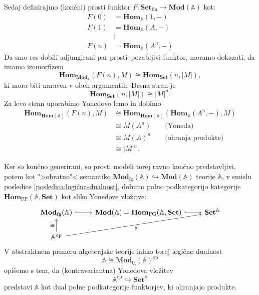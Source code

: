 \documentclass[../kategoricna_logika.tex]{subfiles}
\begin{document}
Sedaj definirajmo (končni) prosti funktor \(F : \mathbf{Set}_{ \mathrm{fin}} \to \mathbf{Mod}(\mathbb{A})\) 
kot:
\begin{align*}
F(0) &= \mathbf{Hom}_{\mathbb{A}}(1,-) \\
F(1) &= \mathbf{Hom}_{\mathbb{A}}(A,-) \\
&\vdots \\
F(n) &= \mathbf{Hom}_{\mathbb{A}}(A^n, -)
\end{align*}
Da smo res dobili adjungirani par prosti--pozabljivi funktor, moramo dokazati, da
imamo izomorfizem
\[ \mathbf{Hom}_{\mathbf{Mod}_{\mathbb{A}}}(F(n), M) \cong \mathbf{Hom}_{\mathbf{Set}}(n, |M|), \]
ki mora biti naraven v obeh argumentih. Desna stran je 
\[\mathbf{Hom}_{\mathbf{Set}}(n, |M|) \cong |M|^n. \]
Za levo stran uporabimo Yonedovo lemo in dobimo
\begin{align*}
\mathbf{Hom}_{\mathbf{Hom}(\mathbb{A})}(F(n),M) &\cong  \mathbf{Hom}_{\mathbf{Hom}(\mathbb{A})}(\mathbf{Hom}_{\mathbb{A}}(A^n, -), M) \\
&\cong M(A^n) \qquad \text{(Yoneda)} \\
&\cong M(A)^n \qquad \text{(ohranja produkte)} \\
&\cong |M|^n.
\end{align*}

Ker so končno generirani, so prosti modeli torej ravno končno predstavljivi, potem
kot ">obratno"< semantiko
\(\mathbf{Mod}_{\mathrm{fg}}(\mathbb{A}) \hookrightarrow \mathbf{Mod}(\mathbb{A})\)
teorije \(\mathbb{A}\), v smislu posledice \ref{posledica:logična-dualnost},
dobimo polno podkategorijo kategorije
\(\mathbf{Hom}_{\mathrm{FP}}(\mathbb{A}, \mathbf{Set})\) kot sliko Yonedove vložitve:
\begin{equation*}
\begin{tikzcd}
\mathbf{Mod}_{\mathrm{fg}}(\mathbb{A}) \ar[r, hook] & \mathbf{Mod}(\mathbb{A}) = \mathbf{Hom}_{\mathrm{FG}}(\mathbb{A}, \mathbf{Set}) \ar[r, hook] & \mathbf{Set}^{\mathbb{A}} \\
\mathbb{A}^{\mathrm{op}} \ar[u, "\cong"] \ar[urr, "\mathsf{y}"']
\end{tikzcd}
\end{equation*}
V abstraktnem primeru algebrajske teorije lahko torej logično dualnost
\[ \mathbb{A} \cong \mathbf{Mod}_{\mathrm{fg}}(\mathbb{A})^{\mathrm{op}} \]
opišemo s tem, da (kontravariantna) Yonedova vložitev
\[ \mathbb{A}^{\mathrm{op}} \hookrightarrow \mathbf{Set}^{\mathbb{A}} \]
predstavi \(\mathbb{A}\) kot dual polne podkategorije funktorjev, ki ohranjajo produkte.
%
\end{document}
